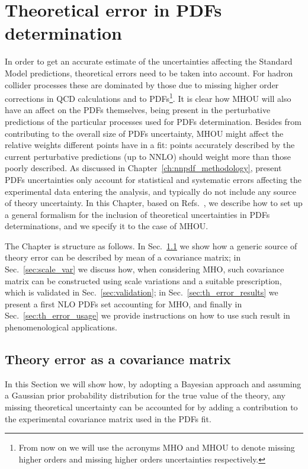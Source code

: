 \chapter{Theoretical error in PDFs determination}
\label{ch:th_error}
In order to get an accurate estimate of the uncertainties affecting the Standard Model predictions, theoretical 
errors need to be taken into account. 
For hadron collider processes these are dominated by those due to missing higher order corrections in QCD calculations 
and to PDFs\footnote{From now on we will use the acronyms MHO and MHOU to denote missing higher orders
 and missing higher orders uncertainties respectively.}. 
It is clear how MHOU will also have an affect on the PDFs themselves, being present in the perturbative predictions
of the particular processes used for PDFs determination. Besides from contributing to the overall
size of PDFs uncertainty, MHOU might affect the relative weights different points have in a fit:
points accurately described by the current perturbative predictions (up to NNLO) should weight more
than those poorly described. 
%
As discussed in Chapter~\ref{ch:nnpdf_methodology}, present PDFs uncertainties only account for statistical and 
systematic errors affecting the experimental data entering the analysis, and typically do not include any source 
of theory uncertainty.
%
In this Chapter, based on Refs.~\cite{AbdulKhalek:2019bux,AbdulKhalek:2019ihb}, we describe how to set up 
a general formalism for the inclusion of theoretical uncertainties in PDFs determinations,
and we specify it to the case of MHOU.

% 
The Chapter is structure as follows. In Sec.~\ref{sec:th_err_as_cov} we show how a generic source of theory error 
can be described by mean of a covariance matrix; in Sec.~\ref{sec:scale_var} we discuss how, when considering
MHO, such covariance matrix can be constructed using scale variations and a suitable prescription,
which is validated in Sec.~\ref{sec:validation};
in Sec.~\ref{sec:th_error_results} we present a first NLO PDFs set accounting for MHO, and finally in Sec.~\ref{sec:th_error_usage}
we provide instructions on how to use such result in phenomenological applications.


 \section{Theory error as a covariance matrix}
 \label{sec:th_err_as_cov}
 In this Section we will show how, by adopting a Bayesian approach and
 assuming a Gaussian prior probability distribution for the true value of the theory, any missing theoretical
 uncertainty can be accounted for by adding a contribution to the experimental covariance matrix used in the PDFs fit.

